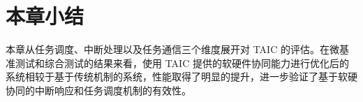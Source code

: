

\section{本章小结}

本章从任务调度、中断处理以及任务通信三个维度展开对 TAIC 的评估。在微基准测试和综合测试的结果来看，使用 TAIC 提供的软硬件协同能力进行优化后的系统相较于基于传统机制的系统，性能取得了明显的提升，进一步验证了基于软硬协同的中断响应和任务调度机制的有效性。
